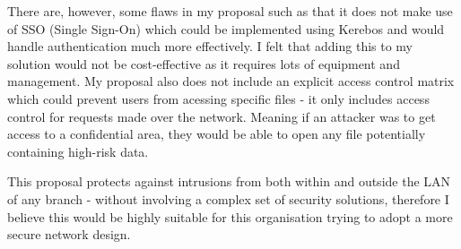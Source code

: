 \documentclass[11pt]{article}
\begin{document}
      There are, however, some flaws in my proposal such as that it does not make use of SSO (Single Sign-On) which could be implemented using Kerebos and would handle authentication much more effectively. I felt that adding this to my solution would not be cost-effective as it requires lots of equipment and management. My proposal also does not include an explicit access control matrix which could prevent users from acessing specific files - it only includes access control for requests made over the network. Meaning if an attacker was to get access to a confidential area, they would be able to open any file potentially containing high-risk data.

      This proposal protects against intrusions from both within and outside the LAN of any branch - without involving a complex set of security solutions, therefore I believe this would be highly suitable for this organisation trying to adopt a more secure network design.

  \newpage

  
  
\end{document}
